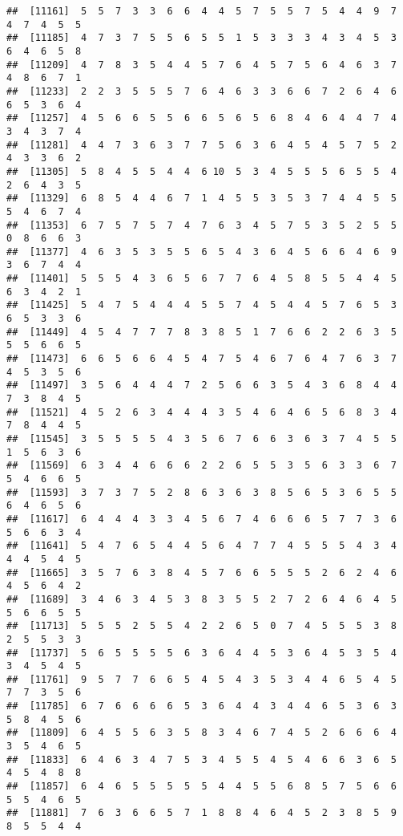 \documentclass[
]{book}
\begin{document}
\begin{verbatim}
##  [11161]  5  5  7  3  3  6  6  4  4  5  7  5  5  7  5  4  4  9  7  4  7  4  5  5
##  [11185]  4  7  3  7  5  5  6  5  5  1  5  3  3  3  4  3  4  5  3  6  4  6  5  8
##  [11209]  4  7  8  3  5  4  4  5  7  6  4  5  7  5  6  4  6  3  7  4  8  6  7  1
##  [11233]  2  2  3  5  5  5  7  6  4  6  3  3  6  6  7  2  6  4  6  6  5  3  6  4
##  [11257]  4  5  6  6  5  5  6  6  5  6  5  6  8  4  6  4  4  7  4  3  4  3  7  4
##  [11281]  4  4  7  3  6  3  7  7  5  6  3  6  4  5  4  5  7  5  2  4  3  3  6  2
##  [11305]  5  8  4  5  5  4  4  6 10  5  3  4  5  5  5  6  5  5  4  2  6  4  3  5
##  [11329]  6  8  5  4  4  6  7  1  4  5  5  3  5  3  7  4  4  5  5  5  4  6  7  4
##  [11353]  6  7  5  7  5  7  4  7  6  3  4  5  7  5  3  5  2  5  5  0  8  6  6  3
##  [11377]  4  6  3  5  3  5  5  6  5  4  3  6  4  5  6  6  4  6  9  3  6  7  4  4
##  [11401]  5  5  5  4  3  6  5  6  7  7  6  4  5  8  5  5  4  4  5  6  3  4  2  1
##  [11425]  5  4  7  5  4  4  4  5  5  7  4  5  4  4  5  7  6  5  3  6  5  3  3  6
##  [11449]  4  5  4  7  7  7  8  3  8  5  1  7  6  6  2  2  6  3  5  5  5  6  6  5
##  [11473]  6  6  5  6  6  4  5  4  7  5  4  6  7  6  4  7  6  3  7  4  5  3  5  6
##  [11497]  3  5  6  4  4  4  7  2  5  6  6  3  5  4  3  6  8  4  4  7  3  8  4  5
##  [11521]  4  5  2  6  3  4  4  4  3  5  4  6  4  6  5  6  8  3  4  7  8  4  4  5
##  [11545]  3  5  5  5  5  4  3  5  6  7  6  6  3  6  3  7  4  5  5  1  5  6  3  6
##  [11569]  6  3  4  4  6  6  6  2  2  6  5  5  3  5  6  3  3  6  7  5  4  6  6  5
##  [11593]  3  7  3  7  5  2  8  6  3  6  3  8  5  6  5  3  6  5  5  6  4  6  5  6
##  [11617]  6  4  4  4  3  3  4  5  6  7  4  6  6  6  5  7  7  3  6  5  6  6  3  4
##  [11641]  5  4  7  6  5  4  4  5  6  4  7  7  4  5  5  5  4  3  4  4  4  5  4  5
##  [11665]  3  5  7  6  3  8  4  5  7  6  6  5  5  5  2  6  2  4  6  4  5  6  4  2
##  [11689]  3  4  6  3  4  5  3  8  3  5  5  2  7  2  6  4  6  4  5  5  6  6  5  5
##  [11713]  5  5  5  2  5  5  4  2  2  6  5  0  7  4  5  5  5  3  8  2  5  5  3  3
##  [11737]  5  6  5  5  5  5  6  3  6  4  4  5  3  6  4  5  3  5  4  3  4  5  4  5
##  [11761]  9  5  7  7  6  6  5  4  5  4  3  5  3  4  4  6  5  4  5  7  7  3  5  6
##  [11785]  6  7  6  6  6  6  5  3  6  4  4  3  4  4  6  5  3  6  3  5  8  4  5  6
##  [11809]  6  4  5  5  6  3  5  8  3  4  6  7  4  5  2  6  6  6  4  3  5  4  6  5
##  [11833]  6  4  6  3  4  7  5  3  4  5  5  4  5  4  6  6  3  6  5  4  5  4  8  8
##  [11857]  6  4  6  5  5  5  5  5  4  4  5  5  6  8  5  7  5  6  6  5  5  4  6  5
##  [11881]  7  6  3  6  6  5  7  1  8  8  4  6  4  5  2  3  8  5  9  8  5  5  4  4

\end{verbatim}
\end{document}
